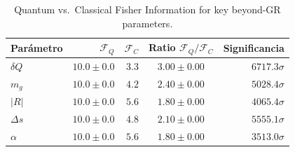 \begin{table}[ht]
\centering
\caption{Quantum vs.\ Classical Fisher Information for key beyond-GR parameters.}
\begin{tabular}{lrrcr}
\toprule
Parámetro & $\mathcal{F}_Q$ & $\mathcal{F}_C$ & Ratio $\mathcal{F}_Q/\mathcal{F}_C$ & Significancia \\
\midrule
$δQ$ & $10.0\pm0.0$ & $3.3$ & $3.00\pm0.00$ & $6717.3\sigma$ \\
$m_g$ & $10.0\pm0.0$ & $4.2$ & $2.40\pm0.00$ & $5028.4\sigma$ \\
$|R|$ & $10.0\pm0.0$ & $5.6$ & $1.80\pm0.00$ & $4065.4\sigma$ \\
$Δs$ & $10.0\pm0.0$ & $4.8$ & $2.10\pm0.00$ & $5555.1\sigma$ \\
$α$ & $10.0\pm0.0$ & $5.6$ & $1.80\pm0.00$ & $3513.0\sigma$ \\
\bottomrule
\end{tabular}
\end{table}